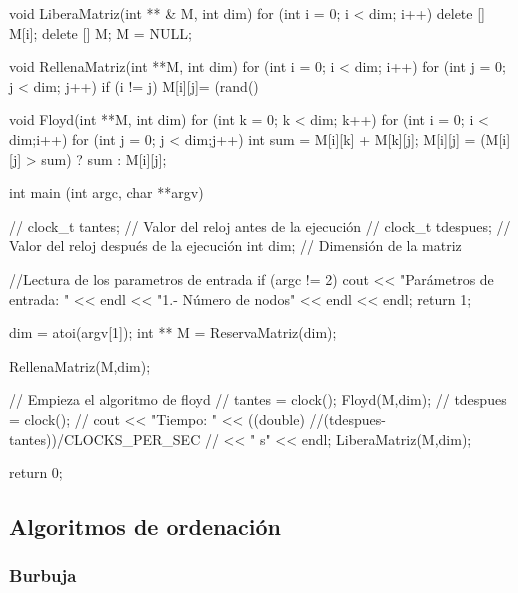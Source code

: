 \documentclass[12pt,spanish]{article}
\begin{document}
\begin{multicols}{2}
\begin{tcblisting}
void LiberaMatriz(int ** & M, int dim)
{
  for (int i = 0; i < dim; i++)
    delete [] M[i];
  delete [] M;
  M = NULL;
}		


void RellenaMatriz(int **M, int dim)
{
  for (int i = 0; i < dim; i++)
    for (int j = 0; j < dim; j++)
      if (i != j)
	M[i][j]= (rand() %
}			
	
void Floyd(int **M, int dim)
{
	for (int k = 0; k < dim; k++)
	  for (int i = 0; i < dim;i++)
	    for (int j = 0; j < dim;j++)
	      {
		int sum = M[i][k] + M[k][j];    	
	    	M[i][j] = (M[i][j] > sum) ? sum : M[i][j];
	      }
}	     	

int main (int argc, char **argv)
{
//  clock_t tantes;    // Valor del reloj antes de la ejecución
//  clock_t tdespues;  // Valor del reloj después de la ejecución
  int dim;           // Dimensión de la matriz

  //Lectura de los parametros de entrada
  if (argc != 2)
    {
      cout << "Parámetros de entrada: " << endl
	   << "1.- Número de nodos" << endl << endl;
      return 1;	
    }	

  dim = atoi(argv[1]);	
  int ** M = ReservaMatriz(dim);

  RellenaMatriz(M,dim);
		
			
  // Empieza el algoritmo de floyd
//  tantes = clock();
  Floyd(M,dim);
//  tdespues = clock();
//  cout << "Tiempo: " << ((double)
//(tdespues-tantes))/CLOCKS_PER_SEC
// << " s" << endl;
  LiberaMatriz(M,dim);

  return 0;
}	
\end{tcblisting}
\end{multicols}
\newpage

\subsection{Algoritmos de ordenación}

\subsubsection{Burbuja}
\end{document}
